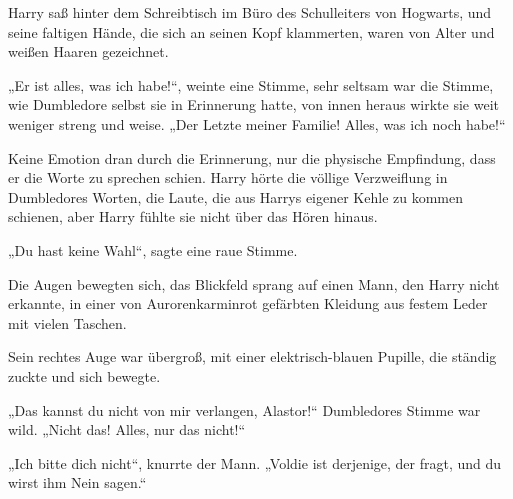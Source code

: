 \begin{em}
Harry saß hinter dem Schreibtisch im Büro des Schulleiters von Hogwarts, und seine faltigen Hände, die sich an seinen Kopf klammerten, waren von Alter und weißen Haaren gezeichnet.

„Er ist alles, was ich habe!“, weinte eine Stimme, sehr seltsam war die Stimme, wie Dumbledore selbst sie in Erinnerung hatte, von innen heraus wirkte sie weit weniger streng und weise.
„Der Letzte meiner Familie! Alles, was ich noch habe!“

Keine Emotion dran durch die Erinnerung, nur die physische Empfindung, dass er die Worte zu sprechen schien. Harry hörte die völlige Verzweiflung in Dumbledores Worten, die Laute, die aus Harrys eigener Kehle zu kommen schienen, aber Harry fühlte sie nicht über das Hören hinaus.

„Du hast keine Wahl“, sagte eine raue Stimme.

Die Augen bewegten sich, das Blickfeld sprang auf einen Mann, den Harry nicht erkannte, in einer von Aurorenkarminrot gefärbten Kleidung aus festem Leder mit vielen Taschen.

Sein rechtes Auge war übergroß, mit einer elektrisch-blauen Pupille, die ständig zuckte und sich bewegte.

„Das kannst du nicht von mir verlangen, Alastor!“ Dumbledores Stimme war wild.
„Nicht das! Alles, nur das nicht!“

„Ich bitte dich nicht“, knurrte der Mann.
„Voldie ist derjenige, der fragt, und du wirst ihm Nein sagen.“


\end{em}
